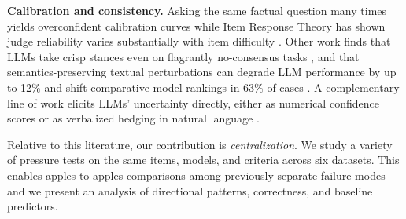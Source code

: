 \textbf{Calibration and consistency.} Asking the same factual question many times yields overconfident calibration
curves \citep{wei2024simpleqa} while Item Response Theory has shown judge reliability varies substantially with 
item difficulty \citep{huang2025irt}. Other work finds that LLMs take crisp stances even on flagrantly 
no-consensus tasks \citep{radharapu2025arbiters}, and that semantics-preserving textual perturbations can degrade LLM 
performance by up to 12\% and shift comparative model rankings in 63\% of cases \citep{romanou2026brittlebench}.
A complementary line of work elicits LLMs' uncertainty directly, either as numerical confidence scores 
\citep{xiong2024confidence, wei2024simpleqa} or as verbalized hedging in natural language 
\citep{yona2024faithful}.

Relative to this literature, our contribution is \emph{centralization}. We study a variety of pressure tests on the 
same items, models, and criteria across six datasets. This enables apples-to-apples comparisons among previously separate 
failure modes and we present an analysis of directional patterns, correctness, and baseline predictors.
